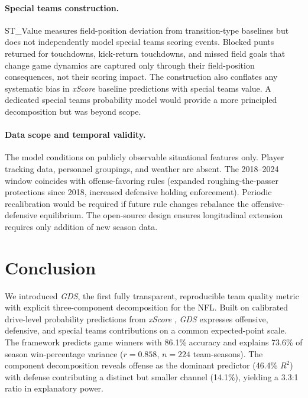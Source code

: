 \documentclass[12pt,a4paper]{article}
\newcommand{\xscore}{\textit{xScore}}
\newcommand{\gds}{\textit{GDS}}
\begin{document}
\paragraph{Special teams construction.}
ST\_Value measures field-position deviation from transition-type baselines but does not independently model special teams scoring events. Blocked punts returned for touchdowns, kick-return touchdowns, and missed field goals that change game dynamics are captured only through their field-position consequences, not their scoring impact. The construction also conflates any systematic bias in \xscore{} baseline predictions with special teams value. A dedicated special teams probability model would provide a more principled decomposition but was beyond scope.

\paragraph{Data scope and temporal validity.}
The model conditions on publicly observable situational features only. Player tracking data, personnel groupings, and weather are absent. The 2018--2024 window coincides with offense-favoring rules (expanded roughing-the-passer protections since 2018, increased defensive holding enforcement). Periodic recalibration would be required if future rule changes rebalance the offensive-defensive equilibrium. The open-source design ensures longitudinal extension requires only addition of new season data.

\section{Conclusion}
\label{sec:conclusion}

We introduced \gds{}, the first fully transparent, reproducible team quality metric with explicit three-component decomposition for the NFL. Built on calibrated drive-level probability predictions from \xscore{} \citep{mecha2026xscore-model}, \gds{} expresses offensive, defensive, and special teams contributions on a common expected-point scale. The framework predicts game winners with 86.1\% accuracy and explains 73.6\% of season win-percentage variance ($r = 0.858$, $n = 224$ team-seasons). The component decomposition reveals offense as the dominant predictor (46.4\% $R^2$) with defense contributing a distinct but smaller channel (14.1\%), yielding a 3.3:1 ratio in explanatory power.
\end{document}
